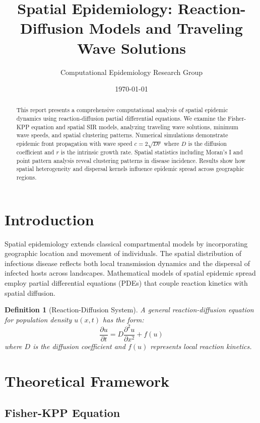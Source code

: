 \documentclass[a4paper, 11pt]{article}
\title{Spatial Epidemiology: Reaction-Diffusion Models and Traveling Wave Solutions}
\author{Computational Epidemiology Research Group}
\date{\today}
\newtheorem{definition}{Definition}[section]
\begin{document}
\maketitle

\begin{abstract}
This report presents a comprehensive computational analysis of spatial epidemic dynamics using
reaction-diffusion partial differential equations. We examine the Fisher-KPP equation and spatial
SIR models, analyzing traveling wave solutions, minimum wave speeds, and spatial clustering patterns.
Numerical simulations demonstrate epidemic front propagation with wave speed $c = 2\sqrt{Dr}$ where
$D$ is the diffusion coefficient and $r$ is the intrinsic growth rate. Spatial statistics including
Moran's I and point pattern analysis reveal clustering patterns in disease incidence. Results show
how spatial heterogeneity and dispersal kernels influence epidemic spread across geographic regions.
\end{abstract}

\section{Introduction}

Spatial epidemiology extends classical compartmental models by incorporating geographic location
and movement of individuals. The spatial distribution of infectious disease reflects both local
transmission dynamics and the dispersal of infected hosts across landscapes. Mathematical models
of spatial epidemic spread employ partial differential equations (PDEs) that couple reaction kinetics
with spatial diffusion.

\begin{definition}[Reaction-Diffusion System]
A general reaction-diffusion equation for population density $u(x,t)$ has the form:
\begin{equation}
\frac{\partial u}{\partial t} = D\frac{\partial^2 u}{\partial x^2} + f(u)
\end{equation}
where $D$ is the diffusion coefficient and $f(u)$ represents local reaction kinetics.
\end{definition}

\section{Theoretical Framework}

\subsection{Fisher-KPP Equation}
\end{document}
